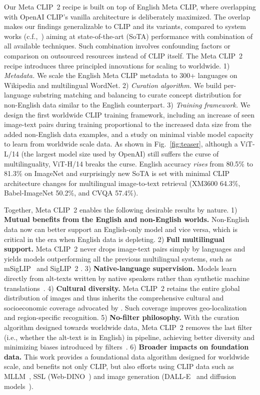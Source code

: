 Our Meta CLIP~2 recipe is built on top of English Meta CLIP, where overlapping with OpenAI CLIP's vanilla architecture is deliberately maximized. The overlap makes our findings generalizable to CLIP and its variants, compared to system works (c.f.,~\citep{zhai2023sigmoid, tschannen2025siglip, bolya2025perception}) aiming at state-of-the-art (SoTA) performance with combination of all available techniques. Such combination involves confounding factors or comparison on outsourced resources instead of CLIP itself.
The Meta CLIP~2 recipe introduces three principled innovations for scaling to worldwide. 
1) \textit{Metadata.}  We scale the English Meta CLIP metadata %
to \(300\)+ languages on Wikipedia and multilingual WordNet.
2) \textit{Curation algorithm.} We build per-language substring matching and balancing to curate concept distribution for non-English data similar to the English counterpart.
3) \textit{Training framework.}
We design the first worldwide CLIP training framework, including an increase of seen image-text pairs during training proportional to the increased data size from the added non-English data examples, and a study on minimal viable model capacity to learn from worldwide scale data. 
As shown in Fig.~\ref{fig:teaser}, although a ViT-L/14 (the largest model size used by OpenAI) still suffers the curse of multilinguality, ViT-H/14 breaks the curse. English accuracy \emph{rises} from 80.5\% to 81.3\% on ImageNet and surprisingly new SoTA is set with minimal CLIP architecture changes for multilingual image-to-text retrieval (XM3600 64.3\%, Babel-ImageNet 50.2\%, and CVQA 57.4\%).

Together, Meta CLIP~2 enables the following desirable results by nature.
1) \textbf{Mutual benefits from the English and non-English worlds.} Non-English data now can better support an English-only model and vice versa, which is critical in the era when English data is depleting. 
2) \textbf{Full multilingual support.} Meta CLIP~2 never drops image-text pairs simply by languages and yields models outperforming all the previous multilingual systems, such as mSigLIP~\citep{zhai2023sigmoid} and SigLIP~2 \citep{tschannen2025siglip}.
3) \textbf{Native-language supervision.} Models learn directly from
alt-texts written by native speakers rather than synthetic machine
translations~\citep{pouget2024no, nguyen2024multilingual}.
4) \textbf{Cultural diversity.} Meta CLIP~2 retains the entire global distribution of images and thus inherits the comprehensive cultural and socioeconomic coverage advocated by \citep{pouget2024no}. Such coverage improves geo-localization and region-specific recognition.
5) \textbf{No-filter philosophy.} 
With the curation algorithm designed towards worldwide data, Meta CLIP~2 removes the last filter (i.e., whether the alt-text is in English) in pipeline, achieving better diversity and minimizing biases introduced by filters~\citep{pouget2024no}.
6) \textbf{Broader impacts on foundation data.} This work provides a foundational data algorithm designed for worldwide scale, and benefits not only CLIP, but also efforts using CLIP data such as MLLM~\citep{grattafiori2024llama,team2024chameleon}, SSL (Web-DINO~\citep{fan2025scaling}) and image generation (DALL-E~\citep{ramesh2021zero} and diffusion models~\citep{yang2023diffusurvey}).

